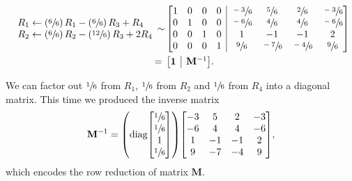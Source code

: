 \documentclass{article}
\begin{document}
\begin{equation}
\begin{aligned}
{\begin{array}{l}
                R_1 \gets \left(\sfrac66\right)R_1 - \left(\sfrac66\right)R_3 + R_4 \\*
                R_2 \gets \left(\sfrac66\right)R_2 - \left(\sfrac{12}6\right)R_3 + 2R_4 \\*
            \end{array}
        }{\sim} & \left[
            \begin{array}{@{}*4c|*4c@{}}
                1 &  0 &  0 &  0 & \sfrac{ -3}6 & \sfrac{ 5}6 & \sfrac{ 2}6 & \sfrac{-3}6 \\*
                0 &  1 &  0 &  0 & \sfrac{ -6}6 & \sfrac{ 4}6 & \sfrac{ 4}6 & \sfrac{-6}6 \\*
                0 &  0 &  1 &  0 &          1   &        -1   &        -1   &         2   \\*
                0 &  0 &  0 &  1 & \sfrac{  9}6 & \sfrac{-7}6 & \sfrac{-4}6 & \sfrac{ 9}6 \\*
            \end{array}
        \right]
    \\*
        {}={}&\left[\begin{array}{@{}c|c@{}}\mathbf{1} & \mathbf{M}^{-1} \end{array}\right]\!.
    \\*
    \end{aligned}
\end{equation}

We can factor out $\sfrac16$ from $R_1$, $\sfrac16$ from $R_2$ and $\sfrac16$ from $R_4$ into a diagonal matrix.
This time we produced the inverse matrix
\begin{equation}
    \mathbf{M}^{-1} = \left(
        \operatorname{diag}\!\left[
            \begin{matrix}
                \sfrac16 \\* \sfrac16 \\* 1 \\* \sfrac16 \\*
            \end{matrix}
        \right]
    \right)\!\left[
        \begin{matrix}
            { -3} & {  5} & { 2} & {-3} \\*
            { -6} & {  4} & { 4} & {-6} \\*
            {  1} &   -1  &  -1  &   2  \\*
            {  9} & {-7} & {-4} & { 9} \\*
        \end{matrix}
    \right]\!,
\end{equation}
which encodes the row reduction of matrix $\mathbf{M}$.
\end{document}
